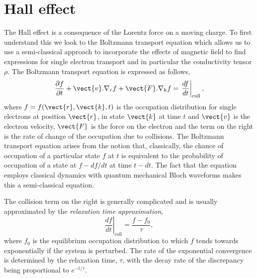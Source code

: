 
\section{Hall effect}

The Hall effect is a consequence of the Lorentz force on a moving charge. To first understand this we look to the Boltzmann transport equation which allows us to use a semi-classical approach to incorporate the effects of magnetic field to find expressions for single electron transport and in particular the conductivity tensor $\rho$. The Boltzmann transport equation is expressed as follows,
\begin{equation}
    \label{Eqn:Theo:BTE}
     \frac{\partial f}{\partial t} + \vect{v}.\nabla_r f + \vect{F} . \nabla_k f = \left.\frac{d f}{d t}\right|_{\textrm{coll}},
\end{equation}
where $f = f(\vect{r}, \vect{k}, t)$ is the occupation distribution for single electrons at position $\vect{r}$, in state $\vect{k}$ at time $t$ and $\vect{v}$ is the electron velocity, $\vect{F}$ is the force on the electron and the term on the right is the rate of change of the occupation due to collisions. The Boltzmann transport equation arises from the notion that, classically, the chance of occupation of a particular state $f$ at $t$ is equivalent to the probability of occupation of a state at $f - df/dt$ at time $t-dt$. The fact that the equation employs classical dynamics with quantum mechanical Bloch waveforms makes this a semi-classical equation.

The collision term on the right is generally complicated and is usually approximated by the \emph{relaxation time approximation},
\begin{equation}
    \left.\frac{d f}{d t}\right|_{\textrm{coll}} = \frac{f - f_0}{\tau},
\end{equation}
where $f_0$ is the equilibrium occupation distribution to which $f$ tends towards exponentially if the system is perturbed. The rate of the exponential convergence is determined by the relaxation time, $\tau$, with the decay rate of the discrepancy being proportional to $e^{-t/\tau}$.

